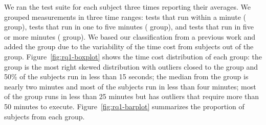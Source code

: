 

We ran the test suite for each subject three times reporting their
averages.  We grouped measurements in three time ranges: tests that
run within a minute (\shortg{} group), tests that run in one to five
minutes (\medg{} group), and tests that run in five or more minutes
(\longg{} group). We based our classification from a previous work
\cite{gligoric-etal-issta2015} and added the \medg{} group due to the
variability of the time cost from subjects out of the \shortg{} group.
Figure~\ref{fig:rq1-boxplot} shows the time cost distribution of each
group: the \shortg{} group is the most right skewed distribution with
outliers closed to the \medg{} group and 50\% of the subjects run in
less than 15 seconds; the median from the \medg{} group is nearly two
minutes and most of the subjects run in less than four minutes; most
of the \longg{} group runs in less than 25 minutes but has outliers
that require more than 50 minutes to execute.
Figure~\ref{fig:rq1-barplot} summarizes the proportion of subjects
from each group.

